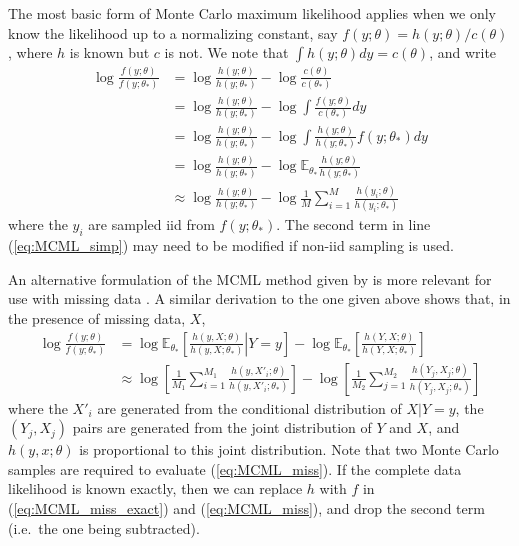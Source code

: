 \documentclass[11pt, oneside]{article}   	%
\newcommand{\bE}{\mathbb{E}}
\begin{document}
The most basic form of Monte Carlo maximum likelihood \citep{Gey91} applies when we only know the likelihood up to a normalizing constant, say $f(y; \theta) = h(y; \theta) / c(\theta)$, where $h$ is known but $c$ is not. We note that $\int h(y; \theta) dy = c(\theta)$, and write
%
\begin{align}
    \log \frac{f(y; \theta)}{f(y; \theta_*)} &= \log \frac{h(y; \theta)}{h(y; \theta_*)} - \log \frac{c(\theta)}{c(\theta_*)}\\
    &= \log \frac{h(y; \theta)}{h(y; \theta_*)} - \log \int \frac{f(y; \theta)}{c(\theta_*)} dy\\
    &= \log \frac{h(y; \theta)}{h(y; \theta_*)} - \log \int \frac{h(y; \theta)}{h(y; \theta_*)} f(y; \theta_*) dy\\
    &= \log \frac{h(y; \theta)}{h(y; \theta_*)} - \log \bE_{\theta_*} \frac{h(y; \theta)}{h(y; \theta_*)}\\
    & \approx \log \frac{h(y; \theta)}{h(y; \theta_*)} - \log \frac{1}{M} \sum_{i=1}^M \frac{h(y_i; \theta)}{h(y_i; \theta_*)} \label{eq:MCML_simp}
\end{align}
%
where the $y_i$ are sampled iid from $f(y; \theta_*)$. The second term in line (\ref{eq:MCML_simp}) may need to be modified if non-iid sampling is used.

An alternative formulation of the MCML method given by \citet{Gel93} is more relevant for use with missing data \citep[see also,][]{Gey94}. A similar derivation to the one given above shows that, in the presence of missing data, $X$,
%
\begin{align}
    \log \frac{f(y; \theta)}{f(y; \theta_*)} &= \log \bE_{\theta_*} \left[ \left. \frac{h(y, X; \theta)}{h(y, X; \theta_*)} \right| Y=y \right] - \log \bE_{\theta_*} \left[\frac{h(Y, X; \theta)}{h(Y, X; \theta_*)}\right] \label{eq:MCML_miss_exact}\\
    & \approx \log \left[\frac{1}{M_1} \sum_{i=1}^{M_1} \frac{h(y, X'_i; \theta)}{h(y, X'_i; \theta_*)}\right] - \log \left[\frac{1}{M_2} \sum_{j = 1}^{M_2} \frac{h(Y_j, X_j; \theta)}{h(Y_j, X_j; \theta_*)}\right] \label{eq:MCML_miss}
\end{align}
%
where the $X'_i$ are generated from the conditional distribution of $X|Y=y$, the $(Y_j, X_j)$ pairs are generated from the joint distribution of $Y$ and $X$, and $h(y, x; \theta)$ is proportional to this joint distribution. Note that two Monte Carlo samples are required to evaluate (\ref{eq:MCML_miss}). If the complete data likelihood is known exactly, then we can replace $h$ with $f$ in (\ref{eq:MCML_miss_exact}) and (\ref{eq:MCML_miss}), and drop the second term (i.e.\ the one being subtracted).
\end{document}
